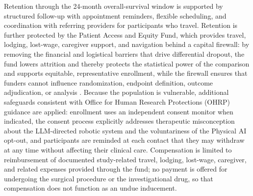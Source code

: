 Retention through the 24-month overall-survival window is supported by structured
follow-up with appointment reminders, flexible scheduling, and coordination with
referring providers for participants who travel. Retention is further protected by
the Patient Access and Equity Fund, which provides travel, lodging, lost-wage,
caregiver support, and navigation behind a capital firewall: by removing the
financial and logistical barriers that drive differential dropout, the fund lowers
attrition and thereby protects the statistical power of the comparison and supports
equitable, representative enrollment, while the firewall ensures that funders cannot
influence randomization, endpoint definition, outcome adjudication, or analysis
\cite{kawchak2026hr9510,ecfr2026part54}. Because the population is vulnerable,
additional safeguards consistent with Office for Human Research Protections (OHRP)
guidance are applied: enrollment uses an independent consent monitor when indicated,
the consent process explicitly addresses therapeutic misconception about the
LLM-directed robotic system and the voluntariness of the Physical AI opt-out, and
participants are reminded at each contact that they may withdraw at any time without
affecting their clinical care. Compensation is limited to reimbursement of
documented study-related travel, lodging, lost-wage, caregiver, and related expenses
provided through the fund; no payment is offered for undergoing the surgical
procedure or the investigational drug, so that compensation does not function as an
undue inducement.
